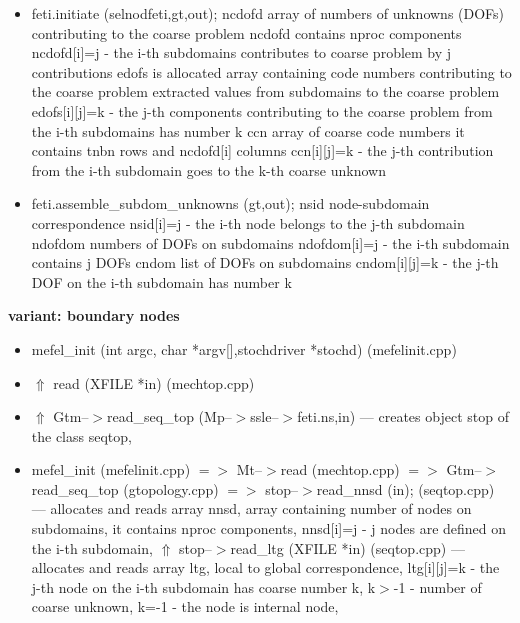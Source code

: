 \begin{itemize}
\item
feti.initiate (selnodfeti,gt,out);
\newline
ncdofd
array of numbers of unknowns (DOFs) contributing to the coarse problem
ncdofd contains nproc components
ncdofd[i]=j - the i-th subdomains contributes to coarse problem by j contributions
\newline
edofs is allocated
array containing code numbers contributing to the coarse problem
extracted values from subdomains to the coarse problem
edofs[i][j]=k - the j-th components contributing to the coarse problem from the i-th subdomains has number k
\newline
ccn
array of coarse code numbers
it contains tnbn rows and ncdofd[i] columns
ccn[i][j]=k - the j-th contribution from the i-th subdomain goes to the k-th coarse unknown

\item
feti.assemble\_subdom\_unknowns (gt,out);
\newline
nsid
node-subdomain correspondence
nsid[i]=j - the i-th node belongs to the j-th subdomain
\newline
ndofdom
numbers of DOFs on subdomains
ndofdom[i]=j - the i-th subdomain contains j DOFs
\newline
cndom
list of DOFs on subdomains
cndom[i][j]=k - the j-th DOF on the i-th subdomain has number k


\end{itemize}

{\bf variant: boundary nodes}
\begin{itemize}
\item
mefel\_init (int argc, char *argv[],stochdriver *stochd) (mefelinit.cpp)

\item
$\Uparrow$ read (XFILE *in) (mechtop.cpp)

\item
$\Uparrow$ Gtm--$>$read\_seq\_top (Mp--$>$ssle--$>$feti.ns,in) --- creates object stop of the class seqtop,

\item
mefel\_init (mefelinit.cpp) $=>$ Mt--$>$read (mechtop.cpp) $=>$ Gtm--$>$read\_seq\_top (gtopology.cpp) $=>$ stop--$>$read\_nnsd (in); (seqtop.cpp) --- allocates and reads array nnsd,
array containing number of nodes on subdomains,
it contains nproc components,
nnsd[i]=j - j nodes are defined on the i-th subdomain,
\newline
$\Uparrow$ stop--$>$read\_ltg (XFILE *in) (seqtop.cpp) --- allocates and reads array ltg,
local to global correspondence,
ltg[i][j]=k - the j-th node on the i-th subdomain has coarse number k,
k$>$-1 - number of coarse unknown,
k=-1 - the node is internal node,

\end{itemize}

